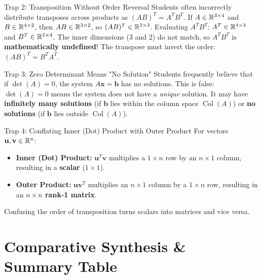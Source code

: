 \begin{trapbox}{Trap 2: Transposition Without Order Reversal}
Students often incorrectly distribute transposes across products as $(AB)^T = A^T B^T$. 
If $A \in \mathbb{R}^{3 \times 4}$ and $B \in \mathbb{R}^{4 \times 2}$, then $AB \in \mathbb{R}^{3 \times 2}$, so $(AB)^T \in \mathbb{R}^{2 \times 3}$. 
Evaluating $A^T B^T$: $A^T \in \mathbb{R}^{4 \times 3}$ and $B^T \in \mathbb{R}^{2 \times 4}$. The inner dimensions (3 and 2) do not match, so $A^T B^T$ is \textbf{mathematically undefined}! The transpose must invert the order: $(AB)^T = B^T A^T$.
\end{trapbox}

\begin{trapbox}{Trap 3: Zero Determinant Means "No Solution"}
Students frequently believe that if $\det(A) = 0$, the system $A\mathbf{x} = \mathbf{b}$ has no solutions. 
This is false: $\det(A) = 0$ means the system does not have a \textit{unique} solution. It may have \textbf{infinitely many solutions} (if $\mathbf{b}$ lies within the column space $\operatorname{Col}(A)$) or \textbf{no solutions} (if $\mathbf{b}$ lies outside $\operatorname{Col}(A)$).
\end{trapbox}

\begin{trapbox}{Trap 4: Conflating Inner (Dot) Product with Outer Product}
For vectors $\mathbf{u}, \mathbf{v} \in \mathbb{R}^n$:
\begin{itemize}
    \item \textbf{Inner (Dot) Product:} $\mathbf{u}^T \mathbf{v}$ multiplies a $1 \times n$ row by an $n \times 1$ column, resulting in a \textbf{scalar} ($1 \times 1$).
    \item \textbf{Outer Product:} $\mathbf{u} \mathbf{v}^T$ multiplies an $n \times 1$ column by a $1 \times n$ row, resulting in an \textbf{$n \times n$ rank-1 matrix}.
\end{itemize}
Confusing the order of transposition turns scalars into matrices and vice versa.
\end{trapbox}

\section{Comparative Synthesis \& Summary Table}

